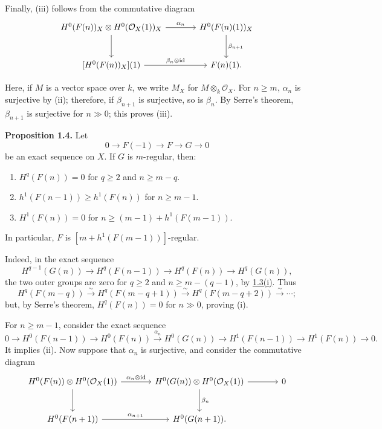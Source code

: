 Finally, (iii) follows from the commutative diagram
\[
\begin{tikzcd}[column sep=large,row sep=large]
H^0(F(n))_X\otimes H^0(\mathcal O_X(1))_X
  \arrow[r,"\alpha_n"]
  \arrow[d]
& H^0(F(n)(1))_X
  \arrow[d,"\beta_{n+1}"] \\
{[H^0(F(n))_X](1)}
  \arrow[r,"\beta_n\otimes\mathrm{id}"]
& F(n)(1).
\end{tikzcd}
\]

\newpage
Here, if \(M\) is a vector space over \(k\), we write \(M_X\) for
\(M\otimes_k\mathcal O_X\). For \(n\geq m\), \(\alpha_n\) is surjective
by (ii); therefore, if \(\beta_{n+1}\) is surjective, so is \(\beta_n\). By
Serre's theorem, \(\beta_{n+1}\) is surjective for \(n\gg0\); this proves
(iii).

\textbf{Proposition 1.4.} Let
\[
  0\longrightarrow F(-1)\longrightarrow F\longrightarrow G\longrightarrow0
\]
be an exact sequence on \(X\). If \(G\) is \(m\)-regular, then:
\begin{enumerate}[label=(\roman*)]
\item \(H^q(F(n))=0\) for \(q\geq2\) and \(n\geq m-q\).
\item \(h^1(F(n-1))\geq h^1(F(n))\) for \(n\geq m-1\).
\item \(H^1(F(n))=0\) for
\(n\geq(m-1)+h^1(F(m-1))\).
\end{enumerate}
In particular, \(F\) is \([m+h^1(F(m-1))]\)-regular.

Indeed, in the exact sequence
\[
  H^{q-1}(G(n))\longrightarrow H^q(F(n-1))
  \longrightarrow H^q(F(n))\longrightarrow H^q(G(n)),
\]
the two outer groups are zero for \(q\geq2\) and
\(n\geq m-(q-1)\), by \hyperlink{sga6.e13.prop.1-3}{1.3(i)}. Thus
\[
  H^q(F(m-q))\xrightarrow{\sim}H^q(F(m-q+1))
  \xrightarrow{\sim}H^q(F(m-q+2))\xrightarrow{\sim}\cdots;
\]
but, by Serre's theorem, \(H^q(F(n))=0\) for \(n\gg0\), proving (i).

For \(n\geq m-1\), consider the exact sequence
\[
  0\to H^0(F(n-1))\to H^0(F(n))
  \xrightarrow{\alpha_n}H^0(G(n))\to H^1(F(n-1))
  \to H^1(F(n))\to0.
\]
It implies (ii). Now suppose that \(\alpha_n\) is surjective, and consider
the commutative diagram
\[
\begin{tikzcd}[column sep=large,row sep=large]
H^0(F(n))\otimes H^0(\mathcal O_X(1))
  \arrow[r,"\alpha_n\otimes\mathrm{id}"]
  \arrow[d]
& H^0(G(n))\otimes H^0(\mathcal O_X(1))
  \arrow[r]
  \arrow[d,"\beta_n"]
& 0 \\
H^0(F(n+1))
  \arrow[r,"\alpha_{n+1}"]
& H^0(G(n+1)).
\end{tikzcd}
\]

